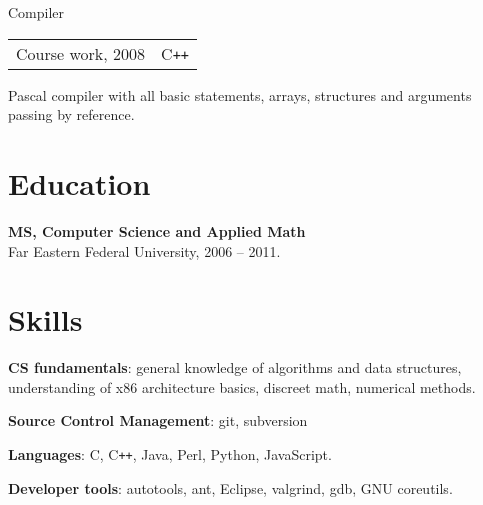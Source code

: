 \documentclass[a4paper]{article}
\begin{document}
\begin{multicols}{2}


		\begin{project}{Compiler}{\begin{tabular}{@{}l|l}Course work, 2008 & C\texttt{++}\\\end{tabular}}
			Pascal compiler with all basic statements, arrays, structures and arguments passing by reference.
		\end{project}
	\end{multicols}

	\section{Education}
	\begin{items}
		\item \textbf{MS, Computer Science and Applied Math}\\
		Far Eastern Federal University, 2006 -- 2011.
	\end{items}

	\section{Skills}
	\begin{multicols}{2}
		\raggedcolumns
		\begin{items}
			\item \textbf{CS fundamentals}: general knowledge of algorithms and data structures, understanding of x86 architecture basics, discreet math, numerical methods.
			\item \textbf{Source Control Management}: git, subversion
			\columnbreak
			\item \textbf{Languages}: C, C\texttt{++}, Java, Perl, Python, JavaScript.
			\item \textbf{Developer tools}: autotools, ant, Eclipse, valgrind, gdb, GNU coreutils.
		\end{items}
	\end{multicols}
\end{document}
